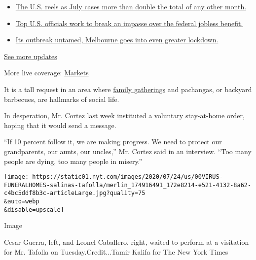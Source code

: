 \begin{itemize}
\tightlist
\item
  \href{https://www.nytimes.com/2020/08/01/world/coronavirus-covid-19.html?action=click\&pgtype=Article\&state=default\&region=MAIN_CONTENT_1\&context=storylines_live_updates\#link-34047410}{The
  U.S. reels as July cases more than double the total of any other
  month.}
\item
  \href{https://www.nytimes.com/2020/08/01/world/coronavirus-covid-19.html?action=click\&pgtype=Article\&state=default\&region=MAIN_CONTENT_1\&context=storylines_live_updates\#link-780ec966}{Top
  U.S. officials work to break an impasse over the federal jobless
  benefit.}
\item
  \href{https://www.nytimes.com/2020/08/01/world/coronavirus-covid-19.html?action=click\&pgtype=Article\&state=default\&region=MAIN_CONTENT_1\&context=storylines_live_updates\#link-2bc8948}{Its
  outbreak untamed, Melbourne goes into even greater lockdown.}
\end{itemize}

\href{https://www.nytimes.com/2020/08/01/world/coronavirus-covid-19.html?action=click\&pgtype=Article\&state=default\&region=MAIN_CONTENT_1\&context=storylines_live_updates}{See
more updates}

More live coverage:
\href{https://www.nytimes.com/live/2020/07/31/business/stock-market-today-coronavirus?action=click\&pgtype=Article\&state=default\&region=MAIN_CONTENT_1\&context=storylines_live_updates}{Markets}

It is a tall request in an area where
\href{https://www.nytimes.com/2020/07/14/us/coronavirus-texas-rio-grande-valley-border.html}{family
gatherings} and pachangas, or backyard barbecues, are hallmarks of
social life.

In desperation, Mr. Cortez last week instituted a voluntary stay-at-home
order, hoping that it would send a message.

``If 10 percent follow it, we are making progress. We need to protect
our grandparents, our aunts, our uncles,'' Mr. Cortez said in an
interview. ``Too many people are dying, too many people in misery.''

\texttt{[image: https://static01.nyt.com/images/2020/07/24/us/00VIRUS-FUNERALHOMES-salinas-tafolla/merlin\_174916491\_172e8214-e521-4132-8a62-c4bc5ddf8b3c-articleLarge.jpg?quality=75\\\&auto=webp\\\&disable=upscale]}

Image

Cesar Guerra, left, and Leonel Caballero, right, waited to perform at a
visitation for Mr. Tafolla on Tuesday.Credit...Tamir Kalifa for The New
York Times


